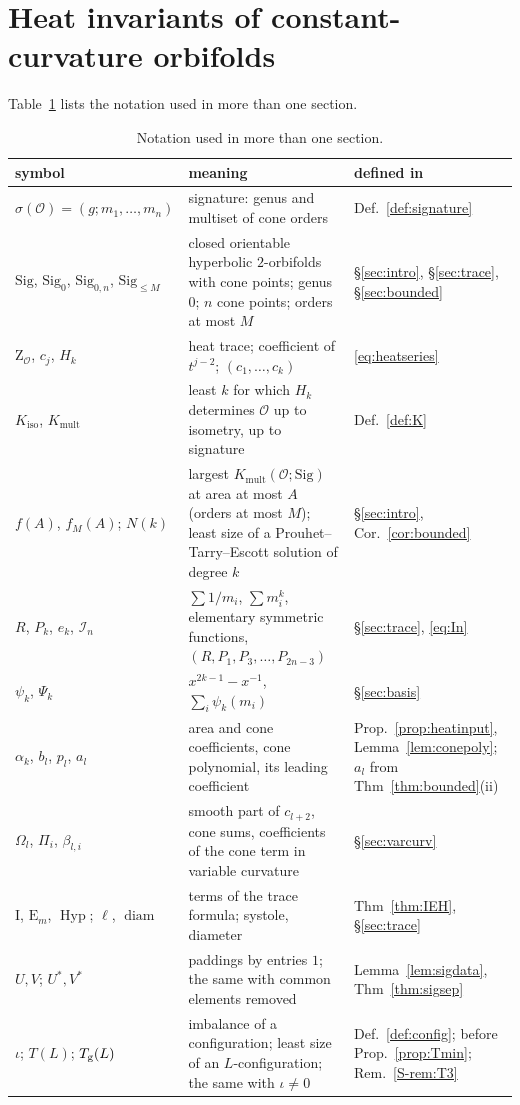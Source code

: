 \documentclass[pdflatex,sn-mathphys-num]{sn-jnl}
\theoremstyle{thmstyleone}%
\theoremstyle{thmstylethree}%
\newcommand{\Orb}{\mathcal{O}}
\newcommand{\Sig}{\mathrm{Sig}}
\newcommand{\Kiso}{K_{\mathrm{iso}}}
\newcommand{\Kmult}{K_{\mathrm{mult}}}
\newcommand{\Hyp}{\operatorname{Hyp}}
\newcommand{\cI}{\mathcal{I}}
\newcommand{\diam}{\operatorname{diam}}
\newcommand{\cZ}{\mathrm{Z}}
\newcommand{\sref}[1]{\ref*{S-#1}}%
\begin{document}
\section{Heat invariants of constant-curvature orbifolds}\label{sec:heat}

Table~\ref{tab:notation} lists the notation used in more than one section.

\begin{table}[t]
\centering\footnotesize
\caption{Notation used in more than one section.}\label{tab:notation}
\setlength{\tabcolsep}{3pt}\begin{tabular}{@{}p{33mm}p{56mm}p{27mm}@{}}
\toprule
symbol & meaning & defined in\\
\midrule
$\sigma(\Orb)=(g;m_1,\dots,m_n)$ & signature: genus and multiset of cone orders & Def.~\ref{def:signature}\\
$\Sig$, $\Sig_0$, $\Sig_{0,n}$, $\Sig_{\le M}$ & closed orientable hyperbolic $2$-orbifolds with cone points; genus $0$; $n$ cone points; orders at most $M$ & \S\ref{sec:intro}, \S\ref{sec:trace}, \S\ref{sec:bounded}\\
$\cZ_\Orb$, $c_j$, $H_k$ & heat trace; coefficient of $t^{j-2}$; $(c_1,\dots,c_k)$ & \eqref{eq:heatseries}\\
$\Kiso$, $\Kmult$ & least $k$ for which $H_k$ determines $\Orb$ up to isometry, up to signature & Def.~\ref{def:K}\\
$f(A)$, $f_M(A)$; $N(k)$ & largest $\Kmult(\Orb;\Sig)$ at area at most $A$ (orders at most $M$); least size of a Prouhet--Tarry--Escott solution of degree $k$ & \S\ref{sec:intro}, Cor.~\ref{cor:bounded}\\
$R$, $P_k$, $e_k$, $\cI_n$ & $\sum1/m_i$, $\sum m_i^k$, elementary symmetric functions, $(R,P_1,P_3,\dots,P_{2n-3})$ & \S\ref{sec:trace}, \eqref{eq:In}\\
$\psi_k$, $\Psi_k$ & $x^{2k-1}-x^{-1}$, $\sum_i\psi_k(m_i)$ & \S\ref{sec:basis}\\
$\alpha_k$, $b_l$, $p_l$, $a_l$ & area and cone coefficients, cone polynomial, its leading coefficient & Prop.~\ref{prop:heatinput}, Lemma~\ref{lem:conepoly}; $a_l$ from Thm~\ref{thm:bounded}(ii)\\
$\Omega_l$, $\Pi_i$, $\beta_{l,i}$ & smooth part of $c_{l+2}$, cone sums, coefficients of the cone term in variable curvature & \S\ref{sec:varcurv}\\
$\mathrm I$, $\mathrm E_m$, $\Hyp$; $\ell$, $\diam$ & terms of the trace formula; systole, diameter & Thm~\ref{thm:IEH}, \S\ref{sec:trace}\\
$U,V$; $U^*,V^*$ & paddings by entries $1$; the same with common elements removed & Lemma~\ref{lem:sigdata}, Thm~\ref{thm:sigsep}\\
$\iota$; $T(L)$; $T_{\rm g}(L)$ & imbalance of a configuration; least size of an $L$-configuration; the same with $\iota\ne0$ & Def.~\ref{def:config}; before Prop.~\ref{prop:Tmin}; Rem.~\sref{rem:T3}\\
\bottomrule
\end{tabular}
\end{table}
\end{document}
